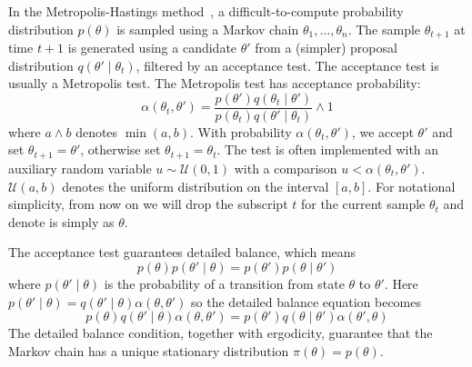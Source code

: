 \documentclass{article}
\begin{document}
In the Metropolis-Hastings method~\cite{gilks1996markov,brooks2011handbook}, a difficult-to-compute
probability distribution $p(\theta)$ is sampled using a Markov chain $\theta_1,\ldots,\theta_n$. The 
sample $\theta_{t+1}$ at time $t+1$ is generated using a candidate $\theta'$ from a (simpler) proposal
distribution $q(\theta'\mid \theta_t)$, filtered by an acceptance test. The acceptance test is usually
a Metropolis test. The Metropolis test has acceptance probability:
\begin{equation}\label{eq:traditional}
\alpha(\theta_t,\theta') = \frac{p(\theta')q(\theta_t \mid \theta')}{p(\theta_t)q(\theta' \mid \theta_t)} \wedge 1
\end{equation}
where $a \wedge b$ denotes $\min(a,b)$.  With probability $\alpha(\theta_t,\theta')$, we accept $\theta'$
and set $\theta_{t+1} = \theta'$, otherwise set
$\theta_{t+1}=\theta_t$.  The test is often implemented with an
auxiliary random variable $u \sim \mathcal{U}(0,1)$ with a comparison $u < \alpha(\theta_t,\theta')$. $\mathcal{U}(a,b)$ denotes the uniform distribution on the interval $[a,b]$. 
For notational simplicity, from now on we will drop the subscript $t$ for the current sample $\theta_t$ and
denote is simply as $\theta$. 


The acceptance test guarantees detailed balance, which means
\begin{equation}\label{detailed_balance1}
  p(\theta)p(\theta'\mid\theta) = p(\theta')p(\theta \mid\theta')
\end{equation}
where $p(\theta'\mid\theta)$ is the probability of a transition from state $\theta$ to $\theta'$. Here
$p(\theta'\mid\theta) = q(\theta'\mid\theta)\alpha(\theta,\theta')$ so the detailed balance equation becomes
\begin{equation}\label{detailed_balance2}
  p(\theta)q(\theta'\mid\theta)\alpha(\theta,\theta') = p(\theta')q(\theta\mid\theta')\alpha(\theta',\theta)
\end{equation}
The detailed balance condition, together with ergodicity, guarantee that the
Markov chain has a unique stationary distribution $\pi(\theta) = p(\theta)$.
\end{document}
